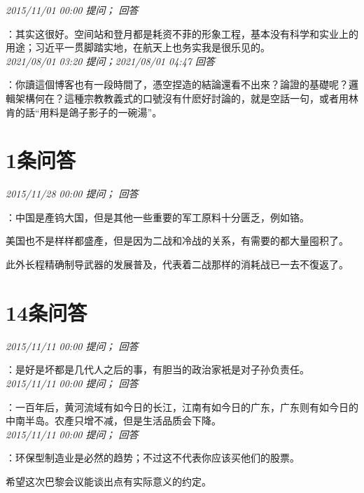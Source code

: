 \documentclass[twocolumn]{ctexart}
\begin{document}
\textit{\hfill\noindent\small 2015/11/01 00:00 提问； 回答}

：其实这很好。空间站和登月都是耗资不菲的形象工程，基本没有科学和实业上的用途；习近平一贯脚踏实地，在航天上也务实我是很乐见的。\\

\textit{\hfill\noindent\small 2021/08/01 03:20 提问；2021/08/01 04:47 回答}

：你讀這個博客也有一段時間了，憑空捏造的結論還看不出來？論證的基礎呢？邏輯架構何在？這種宗教教義式的口號沒有什麽好討論的，就是空話一句，或者用林肯的話“用料是鴿子影子的一碗湯”。
\\

\section{1条问答}

\textit{\hfill\noindent\small 2015/11/28 00:00 提问； 回答}

：中国是產钨大国，但是其他一些重要的军工原料十分匮乏，例如铬。

美国也不是样样都盛產，但是因为二战和冷战的关系，有需要的都大量囤积了。

此外长程精确制导武器的发展普及，代表着二战那样的消耗战已一去不復返了。\\

\section{14条问答}

\textit{\hfill\noindent\small 2015/11/11 00:00 提问； 回答}

：是好是坏都是几代人之后的事，有胆当的政治家衹是对子孙负责任。\\

\textit{\hfill\noindent\small 2015/11/11 00:00 提问； 回答}

：一百年后，黄河流域有如今日的长江，江南有如今日的广东，广东则有如今日的中南半岛。农產只增不减，但是生活品质会下降。\\

\textit{\hfill\noindent\small 2015/11/11 00:00 提问； 回答}

：环保型制造业是必然的趋势；不过这不代表你应该买他们的股票。

希望这次巴黎会议能谈出点有实际意义的约定。\\
\end{document}
